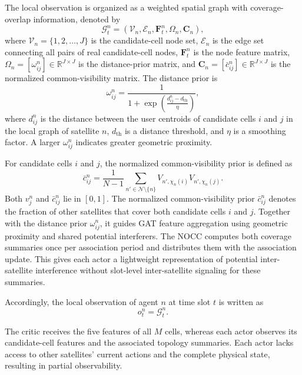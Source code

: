 \documentclass[journal]{IEEEtran}
\begin{document}
The local observation is organized as a weighted spatial graph with coverage-overlap information, denoted by
\begin{equation}
\mathcal{G}_t^n=(\mathcal{V}_n,\mathcal{E}_n,\mathbf{F}_t^n,\Omega_n,\mathbf C_n),
\end{equation}
where $\mathcal V_n=\{1,2,\ldots,J\}$ is the candidate-cell node set, $\mathcal E_n$ is the edge set connecting all pairs of real candidate-cell nodes, $\mathbf F_t^n$ is the node feature matrix, $\Omega_n=[\omega_{ij}^n]\in\mathbb R^{J\times J}$ is the distance-prior matrix, and $\mathbf C_n=[\bar c_{ij}^n]\in\mathbb R^{J\times J}$ is the normalized common-visibility matrix. The distance prior is
\begin{equation}
\omega_{ij}^n=\frac{1}{1+\exp\left(\frac{d_{ij}^n-d_{\mathrm{th}}}{\eta}\right)},
\end{equation}
where $d_{ij}^n$ is the distance between the user centroids of candidate cells $i$ and $j$ in the local graph of satellite $n$, $d_{\mathrm{th}}$ is a distance threshold, and $\eta$ is a smoothing factor. A larger $\omega_{ij}^n$ indicates greater geometric proximity.

For candidate cells $i$ and $j$, the normalized common-visibility prior is defined as
\begin{equation}
\bar c_{ij}^n=\frac{1}{N-1}\sum_{n'\in\mathcal N\setminus\{n\}}V_{n',\chi_n(i)}V_{n',\chi_n(j)}.
\label{eq:common-visibility}
\end{equation}
Both $v_j^n$ and $\bar c_{ij}^n$ lie in $[0,1]$. The normalized common-visibility prior $\bar c_{ij}^n$ denotes the fraction of other satellites that cover both candidate cells $i$ and $j$. Together with the distance prior $\omega_{ij}^n$, it guides GAT feature aggregation using geometric proximity and shared potential interferers. The NOCC computes both coverage summaries once per association period and distributes them with the association update. This gives each actor a lightweight representation of potential inter-satellite interference without slot-level inter-satellite signaling for these summaries.

Accordingly, the local observation of agent $n$ at time slot $t$ is written as
\begin{equation}
o_t^n=\mathcal{G}_t^n.
\end{equation}

The critic receives the five features of all $M$ cells, whereas each actor observes its candidate-cell features and the associated topology summaries. Each actor lacks access to other satellites' current actions and the complete physical state, resulting in partial observability.
\end{document}
